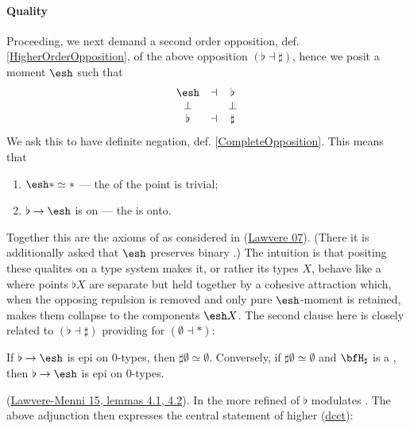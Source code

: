 \hypertarget{quality}{}\paragraph*{{Quality}}\label{quality}
Proceeding, we next demand a second order opposition, def. \ref{HigherOrderOpposition}, of the above opposition $(\flat \dashv \sharp)$, hence we posit a moment $\esh $ such that
\begin{displaymath}
\itexarray{
\esh  &\dashv& \flat
\\
\bot && \bot
\\
\flat &\dashv& \sharp
}
\end{displaymath}
We ask this to have definite negation, def. \ref{CompleteOpposition}. This means that
\begin{enumerate}%
\item $\esh  \ast \simeq \ast$ --- the  of the point is trivial;
\item $\flat \to \esh $ is  on  --- the  is onto.
\end{enumerate}
Together this are the axioms of  as considered in (\hyperlink{Lawvere07}{Lawvere 07}). (There it is additionally asked that $\esh $ preserves binary .)
The intuition is that positing these qualites on a type system makes it, or rather its types $X$, behave like a   where points $\flat X$ are separate but held together by a cohesive attraction which, when the opposing repulsion is removed and only pure $\esh $-moment is retained, makes them collapse to the components $\esh  X$.
The second clause here is closely related to $(\flat \dashv \sharp)$ providing  for $(\emptyset \dashv \ast)$:
\begin{prop}
\label{}\hypertarget{}{}
If $\flat \to \esh $ is epi on 0-types, then $\sharp \emptyset \simeq \emptyset$. Conversely, if $\sharp \emptyset \simeq \emptyset$ and $\bfH_{\sharp}$ is a , then $\flat \to \esh $ is epi on 0-types.
\end{prop}
(\href{http://ncatlab.org/nlab/show/points-to-pieces%20transform#LawvereMenni15}{Lawvere-Menni 15, lemmas 4.1, 4.2}).
In the more refined  of  $\flat$ modulates . The above adjunction then expresses the central statement of higher  (\hyperlink{dcct}{dcct}):
